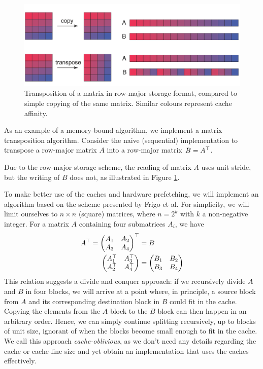 \documentclass[a4paper,11pt, oneside]{report}
\newcommand{\concept}[1]{\emph{#1}}
\begin{document}
\begin{figure}[hbt]
	\centering
	\includegraphics[width=\columnwidth]{transpose-cache.png}
	\caption{Transposition of a matrix in row-major storage format, compared to simple copying of the same matrix. Similar colours represent cache affinity.} \label{fig:transpose}
\end{figure}
\example As an example of a memory-bound algorithm, we implement a matrix transposition algorithm. Consider the naive (sequential) implementation to transpose a row-major matrix $A$ into a row-major matrix $B = A^\top$.

Due to the row-major storage scheme, the reading of matrix $A$ uses unit stride, but the writing of $B$ does not, as illustrated in Figure \ref{fig:transpose}.


To make better use of the caches and hardware prefetching, we will implement an algorithm based on the scheme presented by Frigo et al.\cite{frigo} For simplicity, we will limit ourselves to $n \times n$ (square) matrices, where $n = 2^k$ with $k$ a non-negative integer. For a matrix $A$ containing four submatrices $A_i$, we have
\begin{equation*}
\begin{split}
A^\top = \begin{pmatrix}A_1 & A_2 \\ A_3 & A_4\end{pmatrix}^\top &= B \\
\begin{pmatrix}A_1^\top & A_3^\top \\ A_2^\top & A_4^\top\end{pmatrix}  &= \begin{pmatrix}B_1 & B_2 \\ B_3 & B_4\end{pmatrix}
\end{split}
\end{equation*}
This relation suggests a divide and conquer approach: if we recursively divide $A$ and $B$ in four blocks, we will arrive at a point where, in principle, a source block from $A$ and its corresponding destination block in $B$ could fit in the cache. Copying the elements from the $A$ block to the $B$ block can then happen in an arbitrary order. Hence, we can simply continue splitting recursively, up to blocks of unit size, ignorant of when the blocks become small enough to fit in the cache. We call this approach \concept{cache-oblivious}, as we don't need any details regarding the cache or cache-line size and yet obtain an implementation that uses the caches effectively.
\end{document}
